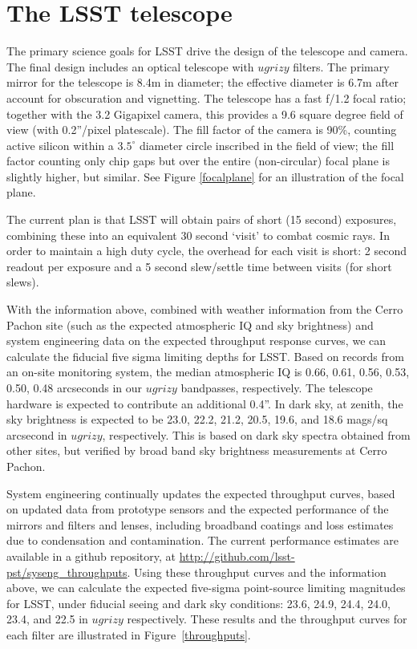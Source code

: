 \documentclass{iau}
\begin{document}

\section{The LSST telescope}

The primary science goals for LSST drive the design of the telescope
and camera. The final design includes an optical telescope with
$ugrizy$ filters. The primary mirror for the
telescope is 8.4m in diameter; the effective diameter is 6.7m after
account for obscuration and vignetting. The telescope has a fast f/1.2
focal ratio; together with the 3.2 Gigapixel camera, this provides a
9.6 square degree field of view (with 0.2''/pixel platescale). The
fill factor of the camera is 90\%, counting active silicon within a
$3.5^\circ$ diameter circle inscribed in the field
of view; the fill factor counting only chip gaps but over the entire
(non-circular) focal plane is slightly higher, but similar. See Figure \ref{focalplane} for
an illustration of the focal plane.


The current plan is that LSST will obtain pairs of short (15 second)
exposures, combining these into an equivalent 30 second `visit' to
combat cosmic rays. In order to maintain a high duty cycle, the
overhead for each visit is short: 2 second readout per exposure and a
5 second slew/settle time between visits (for short slews).

With the information above, combined with weather information from the
Cerro Pachon site (such as the expected atmospheric IQ and sky
brightness) and system engineering data on the expected throughput
response curves, we can calculate the fiducial five sigma limiting
depths for LSST. Based on records from an on-site monitoring system,
the median atmospheric IQ is 0.66, 0.61, 0.56, 0.53, 0.50, 0.48
arcseconds in our $ugrizy$ bandpasses, respectively. The telescope
hardware is expected to contribute an additional 0.4''. In dark sky,
at zenith, the sky brightness is expected to be 23.0, 22.2, 21.2,
20.5, 19.6, and 18.6 mags/sq arcsecond in $ugrizy$, respectively. This
is based on dark sky spectra obtained from other sites, but verified
by broad band sky brightness measurements at Cerro Pachon.

System engineering continually updates the expected throughput curves,
based on updated data from prototype sensors and the expected performance of
the mirrors and filters and lenses, including broadband coatings and
loss estimates due to condensation and contamination. The current
performance estimates are available in a github repository, at
\url{http://github.com/lsst-pst/syseng_throughputs}.  Using these
throughput curves and the information above, we can calculate the
expected five-sigma point-source limiting magnitudes for LSST, under
fiducial seeing and dark sky conditions: 23.6, 24.9, 24.4, 24.0, 23.4,
and 22.5 in $ugrizy$ respectively. These results and the throughput
curves for each filter are illustrated in Figure~\ref{throughputs}.
\end{document}
